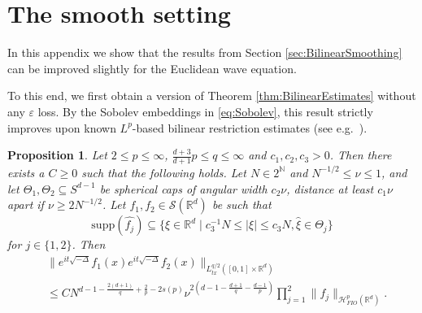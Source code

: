 \documentclass{amsart}
\numberwithin{equation}{section}
\newtheorem{proposition}[theorem]{Proposition}
\theoremstyle{definition}
\newcommand{\R}{\mathbb{R}}
\newcommand{\Rd}{\mathbb{R}^{d}}
\newcommand{\N}{\mathbb{N}}
\newcommand {\Hp}{\mathcal{H}^{p}_{FIO}(\R^d)}
\newcommand {\veps}{\varepsilon}
\newcommand {\Sw}{\mathcal{S}}
\newcommand {\supp}{\mathrm{supp}}
\newcommand {\wh}{\widehat}
\begin{document}
\section{The smooth setting}\label{sec:smooth}


In this appendix we show that the results from Section \ref{sec:BilinearSmoothing} can be improved slightly for the Euclidean wave equation.


To this end, we first obtain a version of Theorem \ref{thm:BilinearEstimates} without any $\veps$ loss. By the Sobolev embeddings in \eqref{eq:Sobolev}, this result strictly improves upon known $L^{p}$-based bilinear restriction estimates (see e.g.~\cite[Theorem 2.2]{ChLeLi26}). 

\begin{proposition}\label{prop:BilinearEstimatesEuclidean}
Let $2\leq p\leq \infty$, $\frac{d+3}{d+1}p\leq q\leq \infty$ and $c_{1},c_{2},c_{3}>0$. 
Then there exists a $C\geq0$ such that the following holds. Let $N\in 2^{\N}$ and $N^{-1/2}\leq \nu\leq 1$, and let $\Theta_{1},\Theta_{2}\subseteq S^{d-1}$ be spherical caps of angular width $c_{2}\nu$, distance at least $c_{1}\nu$ apart if $\nu\geq 2N^{-1/2}$. 
Let
$f_{1},f_{2}\in\Sw(\Rd)$ be such that 
\[
\supp(\wh{f_{j}})\subseteq \{ \xi \in \R^d \mid c_{3}^{-1}N\leq |\xi|\leq c_{3}N, \hat{\xi}\in\Theta_{j}\} 
\]
for $j\in\{1,2\}$. Then 
\[
\begin{aligned}
&\big\|e^{it\sqrt{-\Delta}}f_{1}(x)e^{it\sqrt{-\Delta}}f_{2}(x)\big\|_{L_{tx}^{q/2}([0,1] \times \R^d)}\\
&\leq CN^{d-1-\frac{2(d+1)}{q}+\frac{2}{p}-2s(p)} \nu^{2(d-1-\frac{d+1}{q}-\frac{d-1}{p})} \prod_{j=1}^2 \| f_{j} \|_{\Hp}.%
\end{aligned}
\]
\end{proposition}
\end{document}
